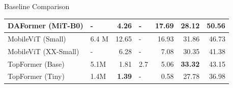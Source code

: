 \documentclass{lib/curtin_format}
\begin{document}
\begin{frame}{Baseline Comparison}
\begin{table}[]
{\begin{tabular}{|l|l|r|l|r|r|r|}
                DAFormer (MiT-B0)    & -                                                         & 4.26                                                                                & -                                                                     & 17.69                                                                                      & 28.12                                                                              & \textbf{50.56}                                                             \\ \hline
                MobileViT (Small)    & 6.4 M                                                     & 12.65                                                                               & -                                                                     & 16.93                                                                                      & 31.86                                                                              & 46.73                                                                      \\ \hline
                MobileViT (XX-Small) & -                                                         & 6.28                                                                                & -                                                                     & 7.08                                                                                       & 30.35                                                                              & 41.38                                                                      \\ \hline
                TopFormer (Base)     & 5.1M                                                      & 1.81                                                                                & \multicolumn{1}{r|}{2.7}                                              & 5.06                                                                                       & \textbf{33.32}                                                                     & 43.15                                                                      \\ \hline
                TopFormer (Tiny)     & 1.4M                                                      & \textbf{1.39}                                                                       & -                                                                     & 0.58                                                                                       & 27.78                                                                              & 36.98                                                                      \\ \hline

\end{tabular}}
\end{table}
\end{frame}
\end{document}
